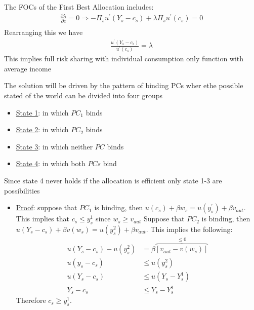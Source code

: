 \documentclass{article}
\begin{document}
\begin{itemize}
\begin{itemize}
\begin{itemize}
            The FOCs of the First Best Allocation includes:
            \begin{gather*}
                \frac{\partial \lambda}{\partial c} = 0 \Rightarrow -\Pi_{s}u^{'}(Y_{s} - c_{s}) + \lambda \Pi_{s} u^{'}(c_{s}) = 0 \\
            \end{gather*}
            Rearranging this we have
            \begin{gather*}
                \frac{u^{'}(Y_{s} - c_{s})}{u^{'}(c_{s})} = \lambda
            \end{gather*}
            This implies full risk sharing with individual consumption only function with average income
        \end{itemize}
        The solution will be driven by the pattern of binding PCs wher ethe possible stated of the world can be divided into four groups
        \begin{itemize}
            \item  \underline{State 1}: in which $PC_{1}$ binds
            \item  \underline{State 2}: in which $PC_{2}$ binds
            \item  \underline{State 3}: in which neither $PC$ binds
            \item  \underline{State 4}: in which both $PCs$ bind
        \end{itemize}
        Since state 4 never holds if the allocation is efficient only state 1-3 are possibilities
        \begin{itemize}
            \item  \underline{Proof}: suppose that $PC_{1}$ is binding, then $u(c_{s}) + \beta w_{s} = u(y_{s}^{'}) + \beta v_{aut}$. This implies that $c_{s} \leq y_{s}^{1}$ since $w_{s} \geq v_{aut}$
            Suppose that $PC_{2}$ is binding, then $u(Y_{s} - c_{s}) + \beta v(w_{s}) = u(y_{s}^{2}) + \beta v_{aut}$. This implies the following:
            \begin{align*}
                u(Y_{s} - c_{s}) - u(y_{s}^{2}) &= \beta \overbrace{[v_{aut} - v(w_{s})]}^{\leq 0} \\
                u(y_{s} - c_{s}) &\leq u(y_{s}^{2}) \\
                u(Y_{s} - c_{s}) &\leq u(Y_{s} - Y_{s}^{1}) \\
                Y_{s} - c_{s} &\leq Y_{s} - Y_{s}^{1}
            \end{align*}
            Therefore $c_{s} \geq y_{s}^{1}$. \\ \\

\end{itemize}
\end{itemize}
\end{itemize}
\end{document}
